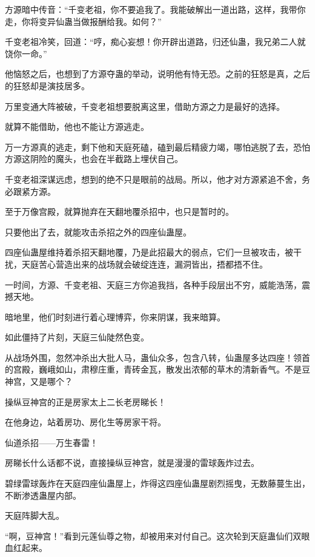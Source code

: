 
\begin{this_body}



方源暗中传音：“千变老祖，你不要追我了。我能破解出一道出路，这样，我带你走，你将变异仙蛊当做报酬给我。如何？”

千变老祖冷笑，回道：“哼，痴心妄想！你开辟出道路，归还仙蛊，我兄弟二人就饶你一命。”

他恼怒之后，也想到了方源夺蛊的举动，说明他有恃无恐。之前的狂怒是真，之后的狂怒却是演技居多。

万里变通大阵被破，千变老祖想要脱离这里，借助方源之力是最好的选择。

就算不能借助，他也不能让方源逃走。

万一方源真的逃走，剩下他和天庭死磕，磕到最后精疲力竭，哪怕逃脱了去，恐怕方源这阴险的魔头，也会在半截路上埋伏自己。

千变老祖深谋远虑，想到的绝不只是眼前的战局。所以，他才对方源紧追不舍，务必跟紧方源。

至于万像宫殿，就算抛弃在天翻地覆杀招中，也只是暂时的。

只要他出了去，就能攻击杀招之外的四座仙蛊屋。

四座仙蛊屋维持着杀招天翻地覆，乃是此招最大的弱点，它们一旦被攻击，被干扰，天庭苦心营造出来的战场就会破绽连连，漏洞皆出，捂都捂不住。

一时间，方源、千变老祖、天庭三方你追我挡，各种手段层出不穷，威能浩荡，震撼天地。

暗地里，他们时刻进行着心理博弈，你来阴谋，我来暗算。

如此僵持了片刻，天庭三仙陡然色变。

从战场外围，忽然冲杀出大批人马，蛊仙众多，包含八转，仙蛊屋多达四座！领首的宫殿，巍峨如山，肃穆庄重，青砖金瓦，散发出浓郁的草木的清新香气。不是豆神宫，又是哪个？

操纵豆神宫的正是房家太上二长老房睇长！

在他身边，站着房功、房化生等房家干将。

仙道杀招——万生春雷！

房睇长什么话都不说，直接操纵豆神宫，就是漫漫的雷球轰炸过去。

碧绿雷球轰炸在天庭四座仙蛊屋上，炸得这四座仙蛊屋剧烈摇曳，无数藤蔓生出，不断渗透蛊屋内部。

天庭阵脚大乱。

“啊，豆神宫！”看到元莲仙尊之物，却被用来对付自己。这次轮到天庭蛊仙们双眼血红起来。


\end{this_body}
